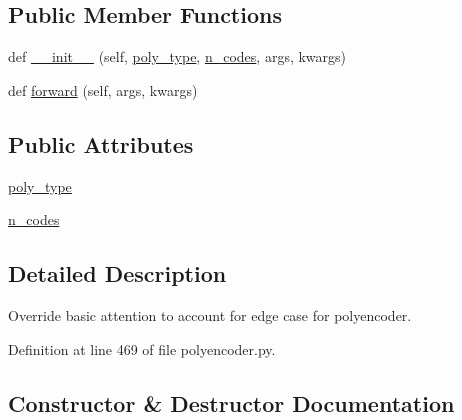 \subsection*{Public Member Functions}
\begin{DoxyCompactItemize}
\item 
def \hyperlink{classparlai_1_1agents_1_1transformer_1_1polyencoder_1_1PolyBasicAttention_a421bbb5dad363d0d16be9ab49b13a4e3}{\+\_\+\+\_\+init\+\_\+\+\_\+} (self, \hyperlink{classparlai_1_1agents_1_1transformer_1_1polyencoder_1_1PolyBasicAttention_aa82d4585cb9a4f671353565fcc0785ab}{poly\+\_\+type}, \hyperlink{classparlai_1_1agents_1_1transformer_1_1polyencoder_1_1PolyBasicAttention_a45603a52525744549d48b10e0bd1b63c}{n\+\_\+codes}, args, kwargs)
\item 
def \hyperlink{classparlai_1_1agents_1_1transformer_1_1polyencoder_1_1PolyBasicAttention_a6927374c5336d0111ab936c1fd2b62ff}{forward} (self, args, kwargs)
\end{DoxyCompactItemize}
\subsection*{Public Attributes}
\begin{DoxyCompactItemize}
\item 
\hyperlink{classparlai_1_1agents_1_1transformer_1_1polyencoder_1_1PolyBasicAttention_aa82d4585cb9a4f671353565fcc0785ab}{poly\+\_\+type}
\item 
\hyperlink{classparlai_1_1agents_1_1transformer_1_1polyencoder_1_1PolyBasicAttention_a45603a52525744549d48b10e0bd1b63c}{n\+\_\+codes}
\end{DoxyCompactItemize}


\subsection{Detailed Description}
\begin{DoxyVerb}Override basic attention to account for edge case for polyencoder.
\end{DoxyVerb}
 

Definition at line 469 of file polyencoder.\+py.



\subsection{Constructor \& Destructor Documentation}
\mbox{\label{classparlai_1_1agents_1_1transformer_1_1polyencoder_1_1PolyBasicAttention_a421bbb5dad363d0d16be9ab49b13a4e3}} 
